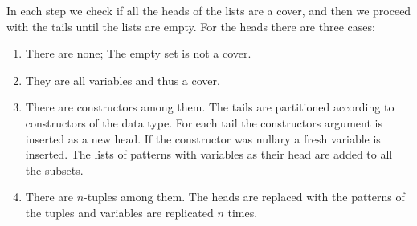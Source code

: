 In each step we check if all the heads of the lists are a cover, and then we
proceed with the tails until the lists are empty. For the heads there are three
cases:
\begin{enumerate}
\item There are none; The empty set is not a cover.
\item They are all variables and thus a cover.
\item There are constructors among them. The tails are partitioned according to
  constructors of the data type. For each tail the constructors argument is
  inserted as a new head. If the constructor was nullary a fresh variable is
  inserted. The lists of patterns with variables as their head are added to all
  the subsets.
\item There are $n$-tuples among them. The heads are replaced with the patterns of
  the tuples and variables are replicated $n$ times.
\end{enumerate}

